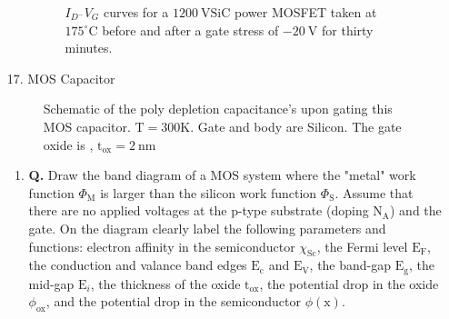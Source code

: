 \documentclass[main.tex]{subfiles}
\begin{document}
\begin{enumerate}
\begin{enumerate}
        \begin{figure}
        \centering{}
        \caption{$I_{D^{-}} V_G$ curves for a $1200 \mathrm{~V} \mathrm{SiC}$ power MOSFET taken at $175^{\circ} \mathrm{C}$ before and after a gate stress of $-20 \mathrm{~V}$ for thirty minutes.}
        \label{fig:16a_f}
        \end{figure}

    \end{enumerate}

\item [17.] MOS Capacitor

    \begin{figure}
    \centering{}
    \caption{Schematic of the poly depletion capacitance's upon gating this MOS capacitor. $\mathrm{T}=300\mathrm{K}$. Gate and body are Silicon. The gate oxide is , $\mathrm{t}_{\mathrm{ox}} = 2 \mathrm{~nm}$ }
    \label{fig:17q_a}
    \end{figure}

    \begin{enumerate}
        \item \textbf{Q.} Draw the band diagram of a MOS system where the "metal" work function $\Phi_{\mathrm{M}}$ is larger than the silicon work function $\Phi_{\mathrm{S}}$. Assume that there are no applied voltages at the p-type substrate (doping $\mathrm{N}_{\mathrm{A}}$) and the gate. On the diagram clearly label the following parameters and functions: electron affinity in the semiconductor $\chi_{\mathrm{Sc}}$, the Fermi level $\mathrm{E}_{\mathrm{F}}$, the conduction and valance band edges $\mathrm{E}_{\mathrm{c}}$ and $\mathrm{E}_{\mathrm{V}}$, the band-gap $\mathrm{E}_{\mathrm{g}}$, the mid-gap $\mathrm{E}_{i}$, the thickness of the oxide $\mathrm{t}_{\mathrm{ox}}$, the potential drop in the oxide $\phi_{\mathrm{ox}}$, and the potential drop in the semiconductor $\phi(\mathrm{x})$. 
        

\end{enumerate}
\end{enumerate}
\end{document}
